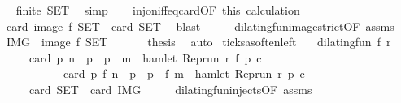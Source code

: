\begin{isabellebody}
\ \isamarkupfalse%
\ {\isacartoucheopen}finite\ {\isacharquery}SET{\isacartoucheclose}\ \isamarkupfalse%
\ simp\isanewline
\ \ \isamarkupfalse%
\ inj{\isacharunderscore}on{\isacharunderscore}iff{\isacharunderscore}eq{\isacharunderscore}card{\isacharbrackleft}OF\ this{\isacharbrackright}\ calculation\ \isamarkupfalse%
\ {\isacartoucheopen}card\ {\isacharparenleft}image\ f\ {\isacharquery}SET{\isacharparenright}\ {\isacharequal}\ card\ {\isacharquery}SET{\isacartoucheclose}\ \isamarkupfalse%
\ blast\isanewline
\ \ \isamarkupfalse%
\ \isamarkupfalse%
\ dilating{\isacharunderscore}fun{\isacharunderscore}image{\isacharunderscore}strict{\isacharbrackleft}OF\ assms{\isacharbrackright}\ \isamarkupfalse%
\ {\isacartoucheopen}{\isacharquery}IMG\ {\isacharequal}\ image\ f\ {\isacharquery}SET{\isacartoucheclose}\ \isacommand{{\isachardot}}\isamarkupfalse%
\isanewline
\ \ \isamarkupfalse%
\ \isamarkupfalse%
\ {\isacharquery}thesis\ \isamarkupfalse%
\ auto\isanewline
{}\isamarkupfalse%
%
\endisatagproof
{\isafoldproof}%
%
\isadelimproof
\isanewline
%
\endisadelimproof
\isanewline
{}\isamarkupfalse%
\ ticks{\isacharunderscore}as{\isacharunderscore}often{\isacharunderscore}left{\isacharcolon}\isanewline
\ \ \ {\isacartoucheopen}dilating{\isacharunderscore}fun\ f\ r{\isacartoucheclose}\isanewline
\ \ \ \ \ {\isacartoucheopen}card\ {\isacharbraceleft}p{\isachardot}\ n\ {\isasymle}\ p\ {\isasymand}\ p\ {\isacharless}\ m\ {\isasymand}\ hamlet\ {\isacharparenleft}{\isacharparenleft}Rep{\isacharunderscore}run\ r{\isacharparenright}\ {\isacharparenleft}f\ p{\isacharparenright}\ c{\isacharparenright}{\isacharbraceright}\isanewline
\ \ \ \ \ \ \ \ \ \ {\isacharequal}\ card\ {\isacharbraceleft}p{\isachardot}\ f\ n\ {\isasymle}\ p\ {\isasymand}\ p\ {\isacharless}\ f\ m\ {\isasymand}\ hamlet\ {\isacharparenleft}{\isacharparenleft}Rep{\isacharunderscore}run\ r{\isacharparenright}\ p\ c{\isacharparenright}{\isacharbraceright}{\isacartoucheclose}\isanewline
\ \ \ \ {\isacharparenleft}\ {\isacartoucheopen}card\ {\isacharquery}SET\ {\isacharequal}\ card\ {\isacharquery}IMG{\isacartoucheclose}{\isacharparenright}\isanewline
%
\isadelimproof
%
\endisadelimproof
%
\isatagproof
{}\isamarkupfalse%
\ {\isacharminus}\isanewline
\ \ \isamarkupfalse%
\ dilating{\isacharunderscore}fun{\isacharunderscore}injects{\isacharbrackleft}OF\ assms{\isacharbrackright}\ \isamarkupfalse%

\end{isabellebody}
